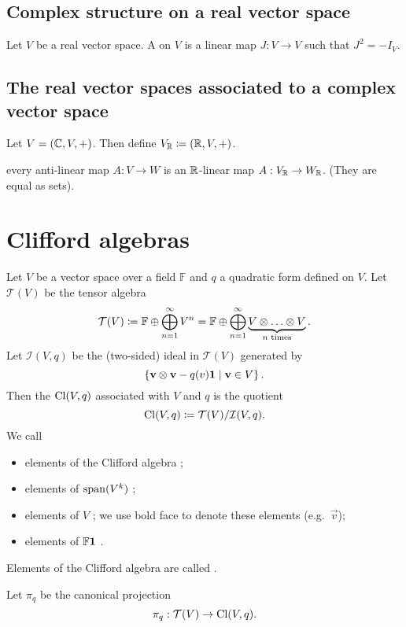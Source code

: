\subsection{Complex structure on a real vector space}
\begin{definition}
Let $V$ be a real vector space. A  on $V$ is a linear map $J: V\to V$ such that $J^2 = -I_V$.
\end{definition}

\subsection{The real vector spaces associated to a complex vector space}
Let $V = (\mathbb{C}, V, +)$. Then define $V_{\mathbb{R}} \coloneqq (\mathbb{R},V,+)$.

every anti-linear map $A:V\to W$ is an $\mathbb{R}$-linear map $A:V_{\mathbb{R}}\to W_{\mathbb{R}}$. (They are equal as sets).

\section{Clifford algebras}
\begin{definition}
Let $V$ be a vector space over a field $\mathbb{F}$ and $q$ a quadratic form defined on $V$.
Let $\mathcal{T}(V)$ be the tensor algebra
\[ \mathcal{T}(V) \coloneqq \mathbb{F}\oplus \bigoplus_{n=1}^\infty V^n = \mathbb{F}\oplus \bigoplus_{n=1}^\infty \underbrace{V\otimes \ldots \otimes V}_{\text{$n$ times}}. \]
Let $\mathcal{I}(V,q)$ be the (two-sided) ideal in $\mathcal{T}(V)$ generated by
\[ \left\{ \boldsymbol{\mathrm{v}}\otimes \boldsymbol{\mathrm{v}} - q(v) \boldsymbol{\mathrm{1}} \;\middle|\; \boldsymbol{\mathrm{v}}\in V \right\}. \]
Then the  $\operatorname{Cl}(V,q)$ associated with $V$ and $q$ is the quotient
\[ \operatorname{Cl}(V,q) \coloneqq \mathcal{T}(V)/\mathcal{I}(V,q). \]
We call
\begin{itemize}
    \item elements of the Clifford algebra ;
    \item elements of $\operatorname{span}(V^k)$ ;
    \item elements of $V$ ; we use bold face to denote these elements (e.g.\ $\vec{v}$);
    \item elements of $\mathbb{F}\boldsymbol{\mathrm{1}}$ .
\end{itemize}
Elements of the Clifford algebra are called .
\end{definition}
Let $\pi_q$ be the canonical projection
\[ \pi_q: \mathcal{T}(V) \to \operatorname{Cl}(V,q). \]


